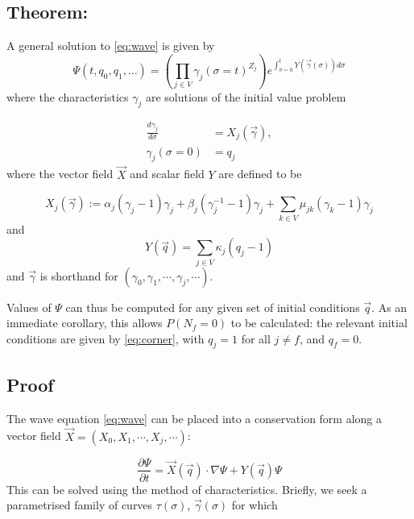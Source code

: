 \documentclass{article}
\begin{document}
\subsection*{Theorem:}


A general solution to \eqref{eq:wave} is given by
\begin{equation}
    \Psi(t,q_0,q_1,\dots) = \left(\prod_{j \in V}
    \gamma_j(\sigma=t)^{Z_j}\right)
    e^{\int_{\sigma=0}^t Y(\vec{\gamma}(\sigma)) d\sigma}
    \label{eq:formalsln}
\end{equation}
where the characteristics ${\gamma}_j$ are solutions of the initial value problem

\begin{align}
    \frac{d {\gamma}_j}{d \sigma} &= {X}_j(\vec{\gamma}),
    \nonumber \\
    {\gamma}_j(\sigma = 0) &= {q}_j
    \label{eq:ivp}
\end{align}
where the vector field $\vec{X}$ and scalar field $Y$ are defined to be

\begin{equation*}
    X_j(\vec{\gamma}) :=
    \alpha_j (\gamma_j - 1) \gamma_j
    + \beta_j (\gamma_j^{-1} - 1) \gamma_j
    + \sum_{k \in V} \mu_{jk} (\gamma_k - 1) \gamma_j
\end{equation*}
and
\begin{equation*}
    Y(\vec{q}) = \sum_{j \in V}\kappa_j (q_j - 1)
\end{equation*}
and $\vec{\gamma}$ is shorthand for $(\gamma_0, \gamma_1, \cdots, \gamma_j,
\cdots)$.

Values of $\Psi$ can thus be computed for any given set of initial conditions
$\vec{q}$. As an immediate corollary, this allows $P(N_f = 0)$ to be calculated:
the relevant initial conditions are given by \eqref{eq:corner}, with $q_j = 1$
for all $j\neq f$, and $q_f = 0$.

\subsection*{Proof}

The wave equation \eqref{eq:wave} can be placed into a conservation form along a vector field
$\vec{X} = (X_0,X_1,\cdots,X_j,\cdots)$:

\begin{equation}
    \frac{\partial \Psi}{\partial t} = \vec{X}(\vec{q}) \cdot \nabla \Psi + Y(\vec{q}) \Psi
    \label{eq:wave2}
\end{equation}
This can be solved using the method of characteristics. Briefly, we seek a
parametrised family of curves $\tau(\sigma)$, $\vec{\gamma}(\sigma)$ for which
\end{document}
